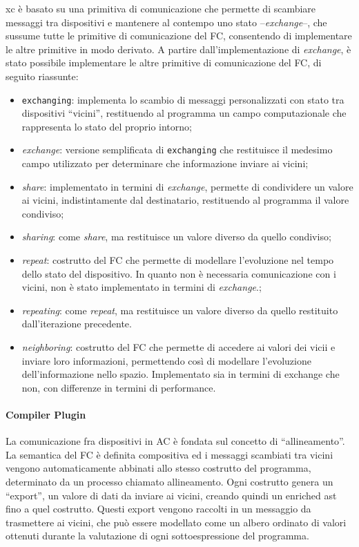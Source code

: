 \documentclass[13pt, a4paper]{article}
\begin{document}
\ac{xc} è basato su una primitiva di comunicazione che permette di scambiare messaggi tra dispositivi e mantenere al contempo uno stato --\emph{exchange}--,
che sussume tutte le primitive di comunicazione del \ac{FC},
consentendo di implementare le altre primitive in modo derivato.
%
A partire dall'implementazione di \emph{exchange}, è stato possibile implementare le altre primitive di comunicazione del \ac{FC},
di seguito riassunte:
\begin{itemize}
    \item \texttt{exchanging}: implementa lo scambio di messaggi personalizzati con stato tra dispositivi ``vicini'',
    restituendo al programma un campo computazionale che rappresenta lo stato del proprio intorno;
    \item \emph{exchange}: versione semplificata di \texttt{exchanging} che restituisce il medesimo campo utilizzato
    per determinare che informazione inviare ai vicini;
    \item \emph{share}: implementato in termini di \emph{exchange}, permette di condividere un valore ai vicini, indistintamente
    dal destinatario, restituendo al programma il valore condiviso;
    \item \emph{sharing}: come \emph{share}, ma restituisce un valore diverso da quello condiviso;
    \item \emph{repeat}: costrutto del \ac{FC} che permette di modellare l'evoluzione nel tempo dello stato del dispositivo.
        In quanto non è necessaria comunicazione con i vicini, non è stato implementato in termini di \emph{exchange}.;
    \item \emph{repeating}: come \emph{repeat}, ma restituisce un valore diverso da quello restituito dall'iterazione precedente.
    \item \emph{neighboring}: costrutto del \ac{FC} che permette di accedere ai valori dei vicii e inviare loro informazioni,
        permettendo così di modellare l'evoluzione dell'informazione nello spazio.
        Implementato sia in termini di exchange che non, con differenze in termini di performance.
\end{itemize}

\paragraph{Compiler Plugin}

La comunicazione fra dispositivi in \ac{AC} è fondata sul concetto di ``allineamento''.
%
La semantica del \ac{FC} è definita compositiva ed i messaggi scambiati tra vicini vengono automaticamente abbinati
    allo stesso costrutto del programma, determinato da un processo chiamato allineamento.
%
Ogni costrutto genera un ``export'', un valore di dati da inviare ai vicini, creando quindi un enriched \ac{ast} fino a quel costrutto. %
%
Questi export vengono raccolti in un messaggio da trasmettere ai vicini, che può essere modellato come
    un albero ordinato di valori ottenuti durante la valutazione di ogni sottoespressione del programma. %
\end{document}
